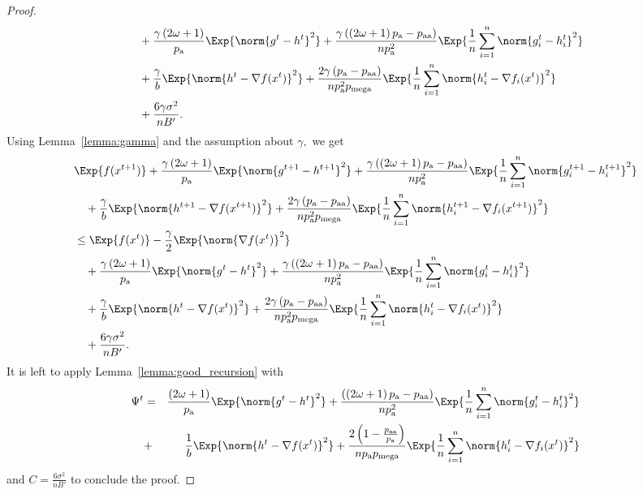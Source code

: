 \documentclass{article}
\newcommand*{\probavailable}{\ensuremath{p_{\textnormal{a}}}}
\newcommand*{\probpairaa}{\ensuremath{p_{\textnormal{aa}}}}
\newcommand*{\probmega}{\ensuremath{p_{\text{mega}}}}
\begin{document}
\begin{proof}
\begin{align*}
    &\quad + \frac{\gamma \left(2 \omega + 1\right)}{\probavailable} \Exp{\norm{g^{t} - h^{t}}^2} + \frac{\gamma\left(\left(2 \omega + 1\right)\probavailable - \probpairaa\right)}{n \probavailable^2}\Exp{\frac{1}{n}\sum_{i=1}^n\norm{g^{t}_i - h^{t}_i}^2} \\
    &\quad + \frac{\gamma}{b} \Exp{\norm{h^{t} - \nabla f(x^{t})}^2} + \frac{2 \gamma \left(\probavailable - \probpairaa\right)}{n \probavailable^2 \probmega}\Exp{\frac{1}{n}\sum_{i=1}^n\norm{h^{t}_i - \nabla f_i(x^{t})}^2} \\
    &\quad + \frac{6 \gamma \sigma^2}{n B'}.
  \end{align*}
  Using Lemma~\ref{lemma:gamma} and the assumption about $\gamma,$ we get
  \begin{align*}
    &\Exp{f(x^{t + 1})} + \frac{\gamma \left(2 \omega + 1\right)}{\probavailable} \Exp{\norm{g^{t+1} - h^{t+1}}^2} + \frac{\gamma\left(\left(2 \omega + 1\right)\probavailable - \probpairaa\right)}{n \probavailable^2} \Exp{\frac{1}{n}\sum_{i=1}^n\norm{g^{t+1}_i - h^{t+1}_i}^2}\\
    &\quad  + \frac{\gamma}{b} \Exp{\norm{h^{t+1} - \nabla f(x^{t+1})}^2} + \frac{2 \gamma \left(\probavailable - \probpairaa\right)}{n \probavailable^2 \probmega} \Exp{\frac{1}{n}\sum_{i=1}^n\norm{h^{t+1}_i - \nabla f_i(x^{t+1})}^2}\\
    &\leq \Exp{f(x^t)} - \frac{\gamma}{2}\Exp{\norm{\nabla f(x^t)}^2} \\
    &\quad + \frac{\gamma \left(2 \omega + 1\right)}{\probavailable} \Exp{\norm{g^{t} - h^{t}}^2} + \frac{\gamma\left(\left(2 \omega + 1\right)\probavailable - \probpairaa\right)}{n \probavailable^2}\Exp{\frac{1}{n}\sum_{i=1}^n\norm{g^{t}_i - h^{t}_i}^2} \\
    &\quad + \frac{\gamma}{b} \Exp{\norm{h^{t} - \nabla f(x^{t})}^2} + \frac{2 \gamma \left(\probavailable - \probpairaa\right)}{n \probavailable^2 \probmega}\Exp{\frac{1}{n}\sum_{i=1}^n\norm{h^{t}_i - \nabla f_i(x^{t})}^2} \\
    &\quad + \frac{6 \gamma \sigma^2}{n B'}.
  \end{align*}
  It is left to apply Lemma~\ref{lemma:good_recursion} with 
    \begin{eqnarray*}
      \Psi^t &=& \frac{\left(2 \omega + 1\right)}{\probavailable} \Exp{\norm{g^{t} - h^{t}}^2} + \frac{\left(\left(2 \omega + 1\right)\probavailable - \probpairaa\right)}{n \probavailable^2}\Exp{\frac{1}{n}\sum_{i=1}^n\norm{g^{t}_i - h^{t}_i}^2} \\
      &+& \frac{1}{b} \Exp{\norm{h^{t} - \nabla f(x^{t})}^2} + \frac{2 \left(1 - \frac{\probpairaa}{\probavailable}\right)}{n \probavailable \probmega}\Exp{\frac{1}{n}\sum_{i=1}^n\norm{h^{t}_i - \nabla f_i(x^{t})}^2}
    \end{eqnarray*}
    and $C = \frac{6 \sigma^2}{n B'}$
    to conclude the proof.
\end{proof}
\end{document}
